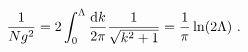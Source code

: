 \begin{equation}
\frac{1}{Ng^2} = 2 \int_0^{\Lambda} \frac{{\rm d}k}{2\pi} \frac{1}{\sqrt{k^2+1}} = \frac{1}{\pi}\ln (2 \Lambda) \ .
\label{d19a}
\end{equation}

